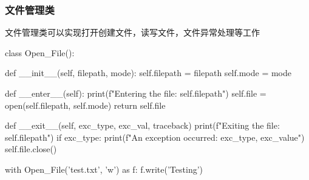     \subsubsection{文件管理类}
      文件管理类可以实现打开创建文件，读写文件，文件异常处理等工作
      \begin{codeblock}[language=python, caption={File management class}]
        class Open_File():

            def __init__(self, filepath, mode):
                self.filepath = filepath
                self.mode = mode

            def __enter__(self):
                print(f"Entering the file: {self.filepath}")
                self.file = open(self.filepath, self.mode)
                return self.file

            def __exit__(self, exc_type, exc_val, traceback)
                print(f"Exiting the file: {self.filepath}")
                if exc_type:
                    print(f"An exception occurred: {exc_type}, {exc_value}")
                self.file.close()

        with Open_File('test.txt', 'w') as f:
            f.write('Testing')
      \end{codeblock}
